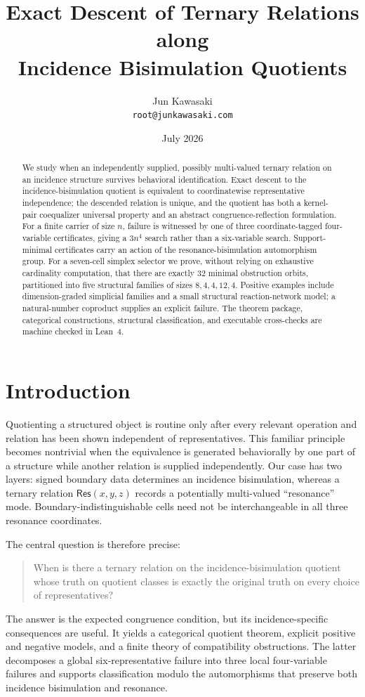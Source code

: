 \documentclass[11pt]{article}
\title{Exact Descent of Ternary Relations along\\Incidence Bisimulation Quotients}
\author{Jun Kawasaki\\\texttt{root@junkawasaki.com}}
\date{July 2026}
\theoremstyle{definition}
\newcommand{\Res}{\mathsf{Res}}
\begin{document}
\maketitle

\begin{abstract}
We study when an independently supplied, possibly multi-valued ternary relation
on an incidence structure survives behavioral identification.  Exact descent to
the incidence-bisimulation quotient is equivalent to coordinatewise
representative independence; the descended relation is unique, and the
quotient has both a kernel-pair coequalizer universal property and an abstract
congruence-reflection formulation.  For a finite carrier of size $n$, failure
is witnessed by one of three coordinate-tagged four-variable certificates,
giving a $3n^4$ search rather than a six-variable search.  Support-minimal
certificates carry an action of the resonance-bisimulation automorphism group.
For a seven-cell simplex selector we prove, without relying on exhaustive
cardinality computation, that there are exactly $32$ minimal obstruction
orbits, partitioned into five structural families of sizes $8,4,4,12,4$.
Positive examples include dimension-graded simplicial families and a small
structural reaction-network model; a natural-number coproduct supplies an
explicit failure.  The theorem package, categorical constructions, structural
classification, and executable cross-checks are machine checked in Lean~4.
\end{abstract}

\section{Introduction}

Quotienting a structured object is routine only after every relevant operation
and relation has been shown independent of representatives.  This familiar
principle becomes nontrivial when the equivalence is generated behaviorally by
one part of a structure while another relation is supplied independently.  Our
case has two layers: signed boundary data determines an incidence bisimulation,
whereas a ternary relation $\Res(x,y,z)$ records a potentially multi-valued
``resonance'' mode.  Boundary-indistinguishable cells need not be
interchangeable in all three resonance coordinates.

The central question is therefore precise:
\begin{quote}
When is there a ternary relation on the incidence-bisimulation quotient whose
truth on quotient classes is exactly the original truth on every choice of
representatives?
\end{quote}
The answer is the expected congruence condition, but its incidence-specific
consequences are useful.  It yields a categorical quotient theorem, explicit
positive and negative models, and a finite theory of compatibility
obstructions.  The latter decomposes a global six-representative failure into
three local four-variable failures and supports classification modulo the
automorphisms that preserve both incidence bisimulation and resonance.
\end{document}

